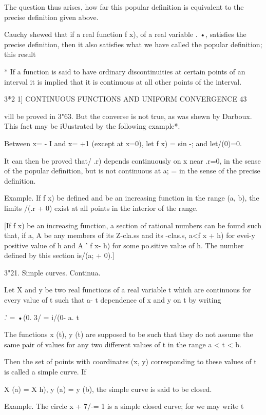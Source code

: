 The question thus arises, how far this popular definition is
equivalent to the precise definition given above.

Cauchy shewed that if a real function f x), of a real variable . •,
satisfies the precise definition, then it also satisfies what we have
called the popular definition; this result

* If a function is said to have ordinary discontinuities at certain
points of an interval it is implied that it is continuous at all other
points of the interval.



3*2 1] CONTINUOUS FUNCTIONS AND UNIFORM CONVERGENCE 43

vill be proved in 3"63. But the converse is not true, as was shewn by
Darboux. This fact may be iUustrated by the following example*.

Between x= - I and x= +1 (except at x=0), let f x) = sin -; and
let/(0)=0.

It can then be proved that/ .r) depends continuously on x near .r=0,
in the sense of the popular definition, but is not continuous at a; =
in the sense of the precise definition.

Example. If f x) be defined and be an increasing function in the range
(a, b), the limits /(.r + 0) exist at all points in the interior of
the range.

[If f x) be an increasing function, a section of rational numbers can
be found such that, if a, A be any members of its Z-cla.ss and its
-clas.s, a<f x + h) for evei-y positive value of h and A ' f x- h) for
some po.sitive value of h. The number defined by this section is/(a; +
0).]

3"21. Simple curves. Continua.

Let X and y be two real functions of a real variable t which are
continuous for every value of t such that a- t %
dependence of x and y on t by writing

.' = •(0. 3/ = i/(0- a. t%

The functions x (t), y (t) are supposed to be such that they do not
assume the same pair of values for any two different values of t in
the range a < t < b.

Then the set of points with coordinates (x, y) corresponding to these
values of t is called a simple curve. If

X (a) = X h), y (a) = y (b), the simple curve is said to be closed.

Example. The circle x + 7/-= 1 is a simple closed curve; for we may
write t

